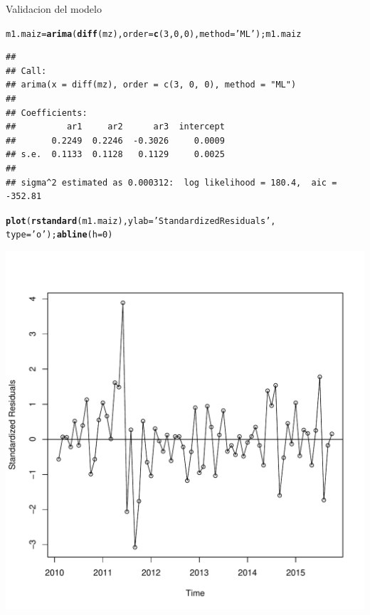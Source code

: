 \documentclass{article}\usepackage[]{graphicx}\usepackage[]{color}
\makeatletter
\def\maxwidth{ %
  \ifdim\Gin@nat@width>\linewidth
    \linewidth
  \else
    \Gin@nat@width
  \fi
}
\newcommand{\hlnum}[1]{\textcolor[rgb]{0.686,0.059,0.569}{#1}}%
\newcommand{\hlstr}[1]{\textcolor[rgb]{0.192,0.494,0.8}{#1}}%
\newcommand{\hlstd}[1]{\textcolor[rgb]{0.345,0.345,0.345}{#1}}%
\newcommand{\hlkwb}[1]{\textcolor[rgb]{0.69,0.353,0.396}{#1}}%
\newcommand{\hlkwc}[1]{\textcolor[rgb]{0.333,0.667,0.333}{#1}}%
\newcommand{\hlkwd}[1]{\textcolor[rgb]{0.737,0.353,0.396}{\textbf{#1}}}%
\newenvironment{kframe}{%
 \def\at@end@of@kframe{}%
 \ifinner\ifhmode%
  \def\at@end@of@kframe{\end{minipage}}%
  \begin{minipage}{\columnwidth}%
 \fi\fi%
 \def\FrameCommand##1{\hskip\@totalleftmargin \hskip-\fboxsep
 \colorbox{shadecolor}{##1}\hskip-\fboxsep
     \hskip-\linewidth \hskip-\@totalleftmargin \hskip\columnwidth}%
 \MakeFramed {\advance\hsize-\width
   \@totalleftmargin\z@ \linewidth\hsize
   \@setminipage}}%
 {\par\unskip\endMakeFramed%
 \at@end@of@kframe}
\newenvironment{knitrout}{}{} %
\makeatother
\begin{document}
Validacion del modelo

\begin{knitrout}
\color{fgcolor}\begin{kframe}
\begin{alltt}
\hlstd{m1.maiz}\hlkwb{=}\hlkwd{arima}\hlstd{(}\hlkwd{diff}\hlstd{(mz),}\hlkwc{order}\hlstd{=}\hlkwd{c}\hlstd{(}\hlnum{3}\hlstd{,}\hlnum{0}\hlstd{,}\hlnum{0}\hlstd{),} \hlkwc{method}\hlstd{=}\hlstr{'ML'}\hlstd{); m1.maiz}
\end{alltt}
\begin{verbatim}
## 
## Call:
## arima(x = diff(mz), order = c(3, 0, 0), method = "ML")
## 
## Coefficients:
##          ar1     ar2      ar3  intercept
##       0.2249  0.2246  -0.3026     0.0009
## s.e.  0.1133  0.1128   0.1129     0.0025
## 
## sigma^2 estimated as 0.000312:  log likelihood = 180.4,  aic = -352.81
\end{verbatim}
\begin{alltt}
\hlkwd{plot}\hlstd{(}\hlkwd{rstandard}\hlstd{(m1.maiz),}\hlkwc{ylab} \hlstd{=}\hlstr{'Standardized Residuals'}\hlstd{,}
       \hlkwc{type}\hlstd{=}\hlstr{'o'}\hlstd{);} \hlkwd{abline}\hlstd{(}\hlkwc{h}\hlstd{=}\hlnum{0}\hlstd{)}
\end{alltt}
\end{kframe}
\includegraphics[width=\maxwidth]{figure/unnamed-chunk-5-1} 

\end{knitrout}
\end{document}
